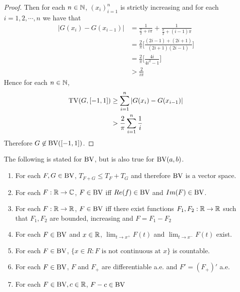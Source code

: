 \documentclass{book}
\begin{document}
\begin{proof}
		Then for each $n \in \mathbb{N}$, $(x_i)_{i=1}^n$ is strictly increasing and for each $i=1,2,\cdots, n$ we have that 
		\begin{align*}
			|G(x_i)-G(x_{i-1})|
			&=\frac{1}{\frac{\pi}{2}+i\pi}+ \frac{1}{\frac{\pi}{2}+(i-1)\pi}\\
			&=\frac{2}{\pi}\bigg[\frac{(2i-1)+(2i+1)}{(2i+1)(2i-1)}\bigg]\\
			&=\frac{2}{\pi}\bigg[\frac{4i}{4i^2-1}\bigg]\\
			& > \frac{2}{i\pi}
		\end{align*}
		\newpage
		Hence for each $n \in \mathbb{N}$,
		\begin{align*}
			\text{TV}(G,[-1,1]) 
			&\geq \sum\limits_{i=1}^n|G(x_i)-G(x_{i-1})| \\
			& > \frac{2}{\pi}\sum\limits_{i=1}^n \frac{1}{i}
		\end{align*}
		Therefore $G \not \in \text{BV}([-1,1])$.
	\end{proof}
	
	\begin{ex}   The following is stated for $\text{BV}$, but is also true for $\text{BV}(a,b)$.
		
		\begin{enumerate} 
			\item For each $F,G \in \text{BV}$, $T_{F+G} \leq T_F + T_G$ and therefore $\text{BV}$ is a vector space. 
			\item For each $F: \mathbb{R} \rightarrow \mathbb{C}$, $F \in \text{BV}$ iff $Re(f) \in \text{BV}$ and $Im(F) \in \text{BV}$.
			\item For each $F:\mathbb{R} \rightarrow \mathbb{R}$, $F \in \text{BV}$ iff there exist functions $F_1,F_2:\mathbb{R} \rightarrow \mathbb{R}$ such that $F_1,F_2$ are bounded, increasing and $F=F_1-F_2$
			\item For each $F \in \text{BV}$ and $x \in \mathbb{R}$, $\lim_{t \rightarrow x^+}F(t)$ and $\lim_{t \rightarrow x^-}F(t)$ exist. 
			\item For each $F \in \text{BV}$, $\{x \in R: F \text{ is not continuous at }x\}$ is countable.
			\item For each $F \in \text{BV}$, $F$ and $F_+$ are differentiable a.e. and $F'=(F_+)'$ a.e.
			\item For each $F \in \text{BV}, c \in \mathbb{R}$, $F-c \in \text{BV}$
		\end{enumerate}
	\end{ex}
	
\end{document}
